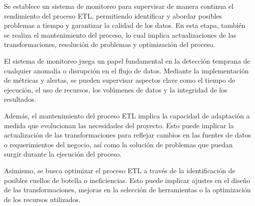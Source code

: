 Se establece un sistema de monitoreo para supervisar de manera continua el rendimiento del proceso ETL, permitiendo identificar y abordar posibles problemas a tiempo y garantizar la calidad de los datos. En esta etapa, también se realiza el mantenimiento del proceso, lo cual implica actualizaciones de las transformaciones, resolución de problemas y optimización del proceso.

El sistema de monitoreo juega un papel fundamental en la detección temprana de cualquier anomalía o disrupción en el flujo de datos. Mediante la implementación de métricas y alertas, se pueden supervisar aspectos clave como el tiempo de ejecución, el uso de recursos, los volúmenes de datos y la integridad de los resultados.

Además, el mantenimiento del proceso ETL implica la capacidad de adaptación a medida que evolucionan las necesidades del proyecto. Esto puede implicar la actualización de las transformaciones para reflejar cambios en las fuentes de datos o requerimientos del negocio, así como la solución de problemas que puedan surgir durante la ejecución del proceso.

Asimismo, se busca optimizar el proceso ETL a través de la identificación de posibles cuellos de botella o ineficiencias. Esto puede implicar ajustes en el diseño de las transformaciones, mejoras en la selección de herramientas o la optimización de los recursos utilizados.